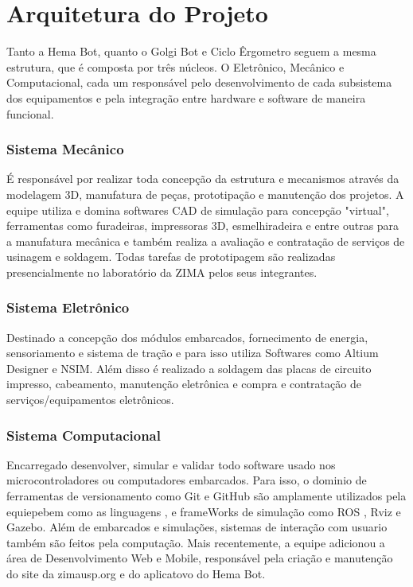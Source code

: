 \documentclass[../poliXuniversity_hospital_(USP)_report.tex]{subfiles}
\begin{document}
\chapter{Arquitetura do Projeto}

Tanto a Hema Bot, quanto o Golgi Bot e Ciclo Êrgometro seguem a mesma estrutura, que é composta por três núcleos. O Eletrônico, Mecânico e Computacional, cada um responsável pelo desenvolvimento de cada subsistema dos equipamentos e pela integração entre hardware e software de maneira funcional.

\subsection{Sistema Mecânico}

É responsável por realizar toda concepção da estrutura e mecanismos através da modelagem 3D, manufatura de peças, prototipação e manutenção dos projetos. A equipe utiliza e domina softwares CAD de simulação para concepção "virtual", ferramentas como furadeiras, impressoras 3D, esmelhiradeira e entre outras para a manufatura mecânica e também realiza a avaliação e contratação de serviços de usinagem e soldagem. Todas tarefas de prototipagem são realizadas presencialmente no laboratório da ZIMA pelos seus integrantes.

\subsection{Sistema Eletrônico}

Destinado a concepção dos módulos embarcados, fornecimento de energia, sensoriamento e sistema de tração e para isso utiliza Softwares como Altium Designer e NSIM. Além disso é realizado a soldagem das placas de circuito impresso, cabeamento, manutenção eletrônica e compra e contratação de serviços/equipamentos eletrônicos.

\subsection{Sistema Computacional}

Encarregado desenvolver, simular e validar todo software usado nos microcontroladores ou computadores embarcados. Para isso, o dominio de ferramentas de versionamento como Git\cite{git21} e GitHub\cite{github21} são amplamente utilizados pela equiepebem como as linguagens \cite{c++21}, \cite{python21} e frameWorks de simulação como ROS \cite{ROS21}, Rviz\cite{rviz21} e Gazebo\cite{gazebo21}. Além de embarcados e simulações, sistemas de interação com usuario também são feitos pela computação. Mais recentemente, a equipe adicionou a área de Desenvolvimento Web e Mobile, responsável pela criação e manutenção do site da zimausp.org e do aplicatovo do Hema Bot.
\end{document}
